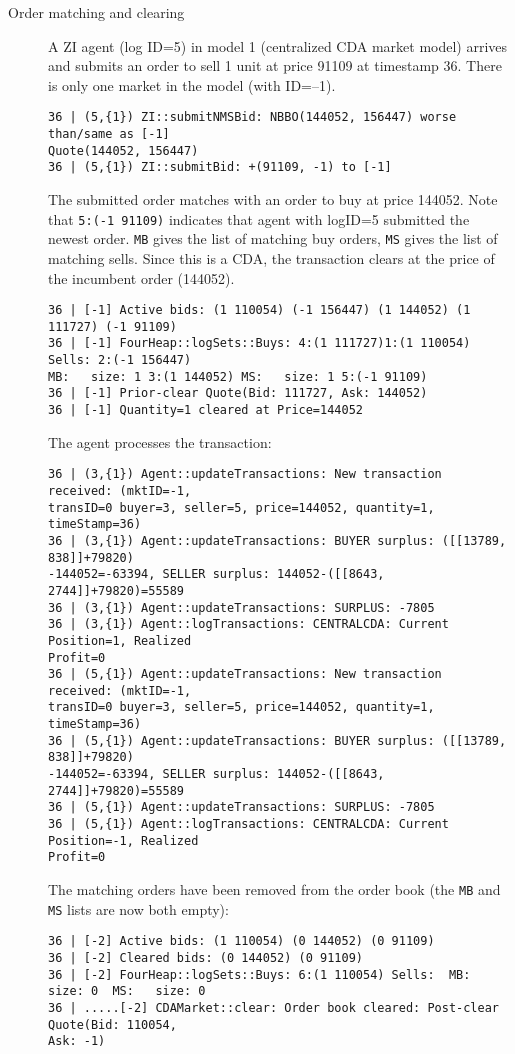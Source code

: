 \documentclass[11pt]{article}
\begin{document}
\begin{description}
\item[Order matching and clearing]
A ZI agent (log ID=5) in model 1 (centralized CDA market model) arrives and submits an order to sell 1 unit at price 91109 at timestamp 36. There is only one market in the model (with ID=--1).
\begin{verbatim}
36 | (5,{1}) ZI::submitNMSBid: NBBO(144052, 156447) worse than/same as [-1] 
Quote(144052, 156447)
36 | (5,{1}) ZI::submitBid: +(91109, -1) to [-1]
\end{verbatim}
%
%
The submitted order matches with an order to buy at price 144052. Note that \verb|5:(-1 91109)| indicates that agent with logID=5 submitted the newest order. \verb|MB| gives the list of matching buy orders, \verb|MS| gives the list of matching sells. Since this is a CDA, the transaction clears at the price of the incumbent order (144052).
%
\begin{verbatim}
36 | [-1] Active bids: (1 110054) (-1 156447) (1 144052) (1 111727) (-1 91109)
36 | [-1] FourHeap::logSets::Buys: 4:(1 111727)1:(1 110054) Sells: 2:(-1 156447) 
MB:   size: 1 3:(1 144052) MS:   size: 1 5:(-1 91109)
36 | [-1] Prior-clear Quote(Bid: 111727, Ask: 144052)
36 | [-1] Quantity=1 cleared at Price=144052
\end{verbatim}
%
%
The agent processes the transaction:
\begin{verbatim}
36 | (3,{1}) Agent::updateTransactions: New transaction received: (mktID=-1, 
transID=0 buyer=3, seller=5, price=144052, quantity=1, timeStamp=36)
36 | (3,{1}) Agent::updateTransactions: BUYER surplus: ([[13789, 838]]+79820)
-144052=-63394, SELLER surplus: 144052-([[8643, 2744]]+79820)=55589
36 | (3,{1}) Agent::updateTransactions: SURPLUS: -7805
36 | (3,{1}) Agent::logTransactions: CENTRALCDA: Current Position=1, Realized 
Profit=0
36 | (5,{1}) Agent::updateTransactions: New transaction received: (mktID=-1, 
transID=0 buyer=3, seller=5, price=144052, quantity=1, timeStamp=36)
36 | (5,{1}) Agent::updateTransactions: BUYER surplus: ([[13789, 838]]+79820)
-144052=-63394, SELLER surplus: 144052-([[8643, 2744]]+79820)=55589
36 | (5,{1}) Agent::updateTransactions: SURPLUS: -7805
36 | (5,{1}) Agent::logTransactions: CENTRALCDA: Current Position=-1, Realized 
Profit=0
\end{verbatim}

%
The matching orders have been removed from the order book (the \verb|MB| and \verb|MS| lists are now both empty):
\begin{verbatim}
36 | [-2] Active bids: (1 110054) (0 144052) (0 91109)
36 | [-2] Cleared bids: (0 144052) (0 91109)
36 | [-2] FourHeap::logSets::Buys: 6:(1 110054) Sells:  MB:   size: 0  MS:   size: 0
36 | .....[-2] CDAMarket::clear: Order book cleared: Post-clear Quote(Bid: 110054, 
Ask: -1)
\end{verbatim}

\end{description}
\end{document}
